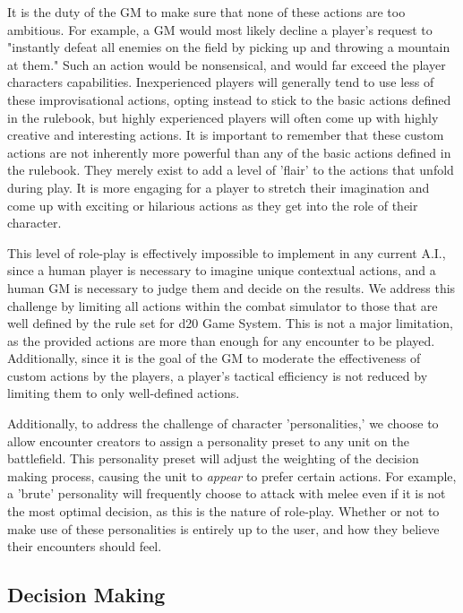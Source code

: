 \documentclass[12pt,a4paper]{report}
\begin{document}
		It is the duty of the GM to make sure that none of these actions are too ambitious. For example, a GM would most likely decline a player's request to "instantly defeat all enemies on the field by picking up and throwing a mountain at them." Such an action would be nonsensical, and would far exceed the player characters capabilities. Inexperienced players will generally tend to use less of these improvisational actions, opting instead to stick to the basic actions defined in the rulebook, but highly experienced players will often come up with highly creative and interesting actions. It is important to remember that these custom actions are not inherently more powerful than any of the basic actions defined in the rulebook. They merely exist to add a level of 'flair' to the actions that unfold during play. It is more engaging for a player to stretch their imagination and come up with exciting or hilarious actions as they get into the role of their character. 
		
		This level of role-play is effectively impossible to implement in any current A.I., since a human player is necessary to imagine unique contextual actions, and a human GM is necessary to judge them and decide on the results. We address this challenge by limiting all actions within the combat simulator to those that are well defined by the rule set for d20 Game System. This is not a major limitation, as the provided actions are more than enough for any encounter to be played. Additionally, since it is the goal of the GM to moderate the effectiveness of custom actions by the players, a player's tactical efficiency is not reduced by limiting them to only well-defined actions. 
		
		Additionally, to address the challenge of character 'personalities,' we choose to allow encounter creators to assign a personality preset to any unit on the battlefield. This personality preset will adjust the weighting of the decision making process, causing the unit to \textit{appear} to prefer certain actions. For example, a 'brute' personality will frequently choose to attack with melee even if it is not the most optimal decision, as this is the nature of role-play. Whether or not to make use of these personalities is entirely up to the user, and how they believe their encounters should feel. 
		
		
		\subsection{Decision Making}
		
\end{document}

